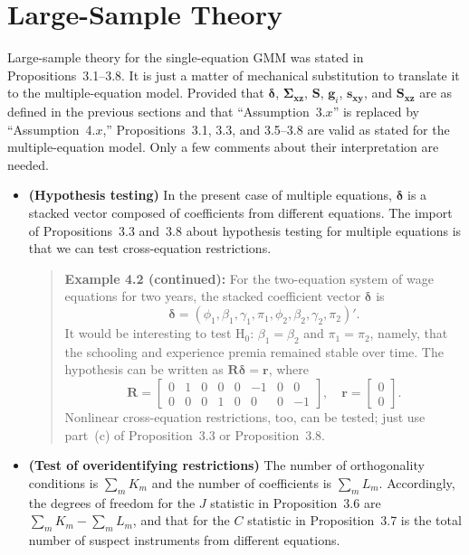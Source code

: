 
\section{Large-Sample Theory}
\label{sec:4.3}

Large-sample theory for the single-equation GMM was stated in Propositions~3.1--3.8.
It is just a matter of mechanical substitution to translate it to the multiple-equation
model. Provided that $\boldsymbol{\delta}$, $\boldsymbol{\Sigma}_{\mathbf{xz}}$,
$\mathbf{S}$, $\mathbf{g}_i$, $\mathbf{s}_{\mathbf{xy}}$, and
$\mathbf{S}_{\mathbf{xz}}$ are as defined in the previous sections and that
``Assumption~3.$x$'' is replaced by ``Assumption~4.$x$,''
Propositions~3.1, 3.3, and 3.5--3.8 are valid as stated for the multiple-equation
model. Only a few comments about their interpretation are needed.

\begin{itemize}
\item \textbf{(Hypothesis testing)}\quad
In the present case of multiple equations, $\boldsymbol{\delta}$ is a stacked
vector composed of coefficients from different equations. The import of Propositions~3.3
and~3.8 about hypothesis testing for multiple equations is that we can
test cross-equation restrictions.

\begin{quote}
\textbf{Example 4.2 (continued):}\quad
For the two-equation system of wage equations for two years, the stacked coefficient
vector $\boldsymbol{\delta}$ is
\[
\boldsymbol{\delta} = (\phi_1, \beta_1, \gamma_1, \pi_1,
\phi_2, \beta_2, \gamma_2, \pi_2)'.
\]
It would be interesting to test $\mathrm{H}_0$: $\beta_1 = \beta_2$ and
$\pi_1 = \pi_2$, namely, that the schooling and experience premia remained stable
over time. The hypothesis can be written as $\mathbf{R}\boldsymbol{\delta} = \mathbf{r}$, where
\[
\mathbf{R} = \begin{bmatrix}
0 & 1 & 0 & 0 & 0 & -1 & 0 & 0 \\
0 & 0 & 0 & 1 & 0 & 0 & 0 & -1
\end{bmatrix}, \quad
\mathbf{r} = \begin{bmatrix} 0 \\ 0 \end{bmatrix}.
\]
Nonlinear cross-equation restrictions, too, can be tested; just use part~(c)
of Proposition~3.3 or Proposition~3.8.
\end{quote}

\item \textbf{(Test of overidentifying restrictions)}\quad
The number of orthogonality conditions is $\sum_m K_m$ and the number of coefficients
is $\sum_m L_m$. Accordingly, the degrees of freedom for the $J$ statistic in
Proposition~3.6 are $\sum_m K_m - \sum_m L_m$, and that for the $C$ statistic in
Proposition~3.7 is the total number of suspect instruments from different equations.
\end{itemize}

